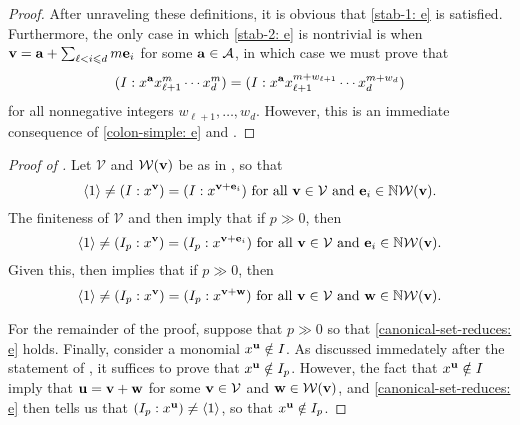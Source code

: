 \documentclass[11pt]{amsart}
\begin{document}
\begin{proof}

After unraveling these definitions, it is obvious that \eqref{stab-1: e} is satisfied.  Furthermore, the only case in which \eqref{stab-2: e} is nontrivial is when $\mathbf{v} = \mathbf{a} + \sum_{\ell <i \leqslant d} m \mathbf{e}_i$ for some $\mathbf{a} \in \mathcal{A}$,  in which case we must prove that
%
\[( I : x^{\mathbf{a}} x_{\ell+1}^m \cdots x_{d}^m ) =   ( I : x^{\mathbf{a}} x_{\ell+1}^{m+w_{\ell+1}} \cdots x_{d}^{m+w_d}) \]
for all nonnegative integers $w_{\ell+1}, \ldots, w_{d}$.  However, this is an immediate consequence of \eqref{colon-simple: e} and .
\end{proof}


\begin{proof}[Proof of ] Let $\mathcal{V}$ and $\mathcal{W}(\mathbf{v})$ be as in , so that \[ \langle 1 \rangle \neq (I : x^{\mathbf{v}}) = (I : x^{\mathbf{v}+\mathbf{e}_i}) \text{ for all } \mathbf{v} \in \mathcal{V} \text{ and } \mathbf{e}_i \in \mathbb{N} \mathcal{W}(\mathbf{v}).\]
The finiteness of $\mathcal{V}$ and  then imply that if $p \gg 0$, then
\[ \langle 1 \rangle \neq (I_p : x^{\mathbf{v}}) = (I_p : x^{\mathbf{v}+\mathbf{e}_i}) \text{ for all } \mathbf{v} \in \mathcal{V} \text{ and } \mathbf{e}_i \in \mathbb{N} \mathcal{W}(\mathbf{v}).\]
Given this,  then implies that if $p \gg 0$, then
\begin{equation}
\label{canonical-set-reduces: e}
\langle 1 \rangle \neq (I_p : x^{\mathbf{v}}) = (I_p : x^{\mathbf{v}+\mathbf{w}}) \text{ for all } \mathbf{v} \in \mathcal{V} \text{ and } \mathbf{w} \in \mathbb{N} \mathcal{W}(\mathbf{v}).
\end{equation}

For the remainder of the proof, suppose that $p \gg 0$ so that \eqref{canonical-set-reduces: e} holds.  Finally, consider a monomial $x^{\mathbf{u}} \notin I$.  As discussed immedately after the statement of , it suffices to prove that $x^{\mathbf{u}} \notin I_p$.  However,   the fact that $x^{\mathbf{u}} \notin I$ imply that $\mathbf{u} = \mathbf{v} + \mathbf{w}$ for some $\mathbf{v} \in \mathcal{V}$ and $\mathbf{w} \in \mathcal{W}(\mathbf{v})$, and \eqref{canonical-set-reduces: e} then tells us that $(I_p:x^{\mathbf{u}}) \neq \langle 1 \rangle$, so that $x^{\mathbf{u}} \notin I_p$.
\end{proof}
\end{document}

